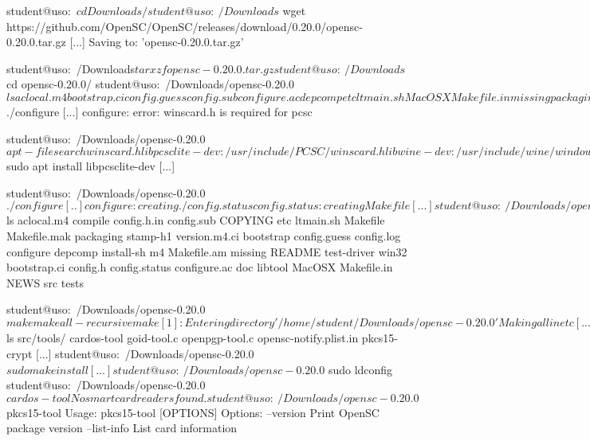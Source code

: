 \begin{screen}[caption={Instalarea OpenSC din surse},label={lst:package:src-install}]
student@uso:~$ cd Downloads/
student@uso:~/Downloads$ wget https://github.com/OpenSC/OpenSC/releases/download/0.20.0/opensc-0.20.0.tar.gz
[...]
Saving to: 'opensc-0.20.0.tar.gz'

student@uso:~/Downloads$ tar xzf opensc-0.20.0.tar.gz
student@uso:~/Downloads$ cd opensc-0.20.0/
student@uso:~/Downloads/opensc-0.20.0$ ls
aclocal.m4  bootstrap.ci  config.guess  config.sub  configure.ac  depcomp  etc         ltmain.sh  MacOSX       Makefile.in   missing  packaging  src          tests          win32
bootstrap   compile       config.h.in   configure   COPYING       doc      install-sh  m4         Makefile.am  Makefile.mak  NEWS     README     test-driver  version.m4.ci

student@uso:~/Downloads/opensc-0.20.0$ ./configure
[...]
configure: error: winscard.h is required for pcsc

student@uso:~/Downloads/opensc-0.20.0$ apt-file search winscard.h
libpcsclite-dev: /usr/include/PCSC/winscard.h
libwine-dev: /usr/include/wine/windows/winscard.h
libwine-development-dev: /usr/include/wine-development/wine/windows/winscard.h
mingw-w64-common: /usr/share/mingw-w64/include/winscard.h
mingw-w64-i686-dev: /usr/i686-w64-mingw32/include/winscard.h
mingw-w64-x86-64-dev: /usr/x86_64-w64-mingw32/include/winscard.h

student@uso:~/Downloads/opensc-0.20.0$ sudo apt install libpcsclite-dev
[...]

student@uso:~/Downloads/opensc-0.20.0$ ./configure
[..]
configure: creating ./config.status
config.status: creating Makefile
[...]

student@uso:~/Downloads/opensc-0.20.0$ ls
aclocal.m4    compile       config.h.in    config.sub    COPYING  etc         ltmain.sh  Makefile     Makefile.mak  packaging  stamp-h1     version.m4.ci
bootstrap     config.guess  config.log     configure     depcomp  install-sh  m4         Makefile.am  missing       README     test-driver  win32
bootstrap.ci  config.h      config.status  configure.ac  doc      libtool     MacOSX     Makefile.in  NEWS          src        tests

student@uso:~/Downloads/opensc-0.20.0$ make
make  all-recursive
make[1]: Entering directory '/home/student/Downloads/opensc-0.20.0'
Making all in etc
  [...]
  CC       compat_getopt_main.o
  CC       compat_dummy.lo
  CC       compat_strlcat.lo
  [...]

student@uso:~/Downloads/opensc-0.20.0$ ls src/tools/
cardos-tool                  goid-tool.c                    openpgp-tool.c                         opensc-notify.plist.in                     pkcs15-crypt
[...]
student@uso:~/Downloads/opensc-0.20.0$ sudo make install
[...]
student@uso:~/Downloads/opensc-0.20.0$ sudo ldconfig
student@uso:~/Downloads/opensc-0.20.0$ cardos-tool
No smart card readers found.
student@uso:~/Downloads/opensc-0.20.0$ pkcs15-tool
Usage: pkcs15-tool [OPTIONS]
Options:
      --version                 Print OpenSC package version
      --list-info               List card information
\end{screen}


